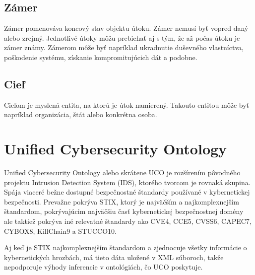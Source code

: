 \documentclass[12pt, a4paper, oneside]{book}
\begin{document}
\subsection{Zámer}
Zámer pomenováva koncový stav objektu útoku. Zámer nemusí byť vopred daný alebo zrejmý. Jednotlivé útoky môžu prebiehať aj s tým, že až počas útoku je zámer známy. Zámerom môže byť napríklad ukradnutie duševného vlastníctva, poškodenie systému, získanie kompromitujúcich dát a podobne.


\subsection{Cieľ}
Cieľom je myslená entita, na ktorú je útok namierený. Takouto entitou môže byť napríklad organizácia, štát alebo konkrétna osoba.





\section{Unified Cybersecurity Ontology}
Unified Cybersecurity Ontology \citep{SyedPFMJ16} alebo skrátene UCO je rozšírením pôvodného projektu Intrusion Detection System (IDS), ktorého tvorcom je rovnaká skupina. Spája viaceré bežne dostupné bezpečnostné štandardy používané v kybernetickej bezpečnosti. Prevažne pokrýva STIX, ktorý je najväčším a najkomplexnejším štandardom, pokrývajúcim najväčšiu časť kybernetickej bezpečnostnej domény ale taktiež pokrýva iné relevatné štandardy ako CVE4, CCE5, CVSS6, CAPEC7, CYBOX8, KillChain9 a STUCCO10.


Aj keď je STIX najkomplexnejším štandardom a zjednocuje všetky informácie o kybernetických hrozbách, má tieto dáta uložené v XML súboroch, takže nepodporuje výhody inferencie v ontológiách, čo UCO poskytuje.
\end{document}
